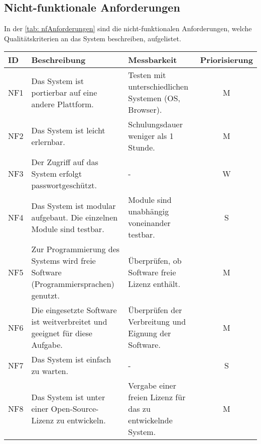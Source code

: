 \subsection{Nicht-funktionale Anforderungen}
In der \autoref{tab: nfAnforderungen} sind die nicht-funktionalen Anforderungen, welche Qualitätskriterien an das System
beschreiben, aufgelistet.
\begingroup
\setlength{\tabcolsep}{10pt} %
\renewcommand{\arraystretch}{1.25} 
\begin{table}[h]
    \centering
    \begin{adjustbox}{max width=\textwidth}
    \begin{tabular}{lp{7.5cm}p{7.5cm}c}
       \toprule
       \textbf{ID}          & \textbf{Beschreibung} & \textbf{Messbarkeit} & \textbf{Priorisierung}\\
       \midrule
        NF1                               &Das System ist portierbar auf eine andere Plattform. & Testen mit unterschiedlichen Systemen (OS, Browser). & M\\
        NF2                               &Das System ist leicht erlernbar.& Schulungsdauer weniger als 1 Stunde.  & M\\
        NF3                               &Der Zugriff auf das System erfolgt passwortgeschützt. & -  & W\\
        NF4                               &Das System ist modular aufgebaut. Die einzelnen Module sind testbar. & Module sind unabhängig voneinander testbar. & S\\
        NF5                               &Zur Programmierung des Systems wird freie Software (Programmiersprachen) genutzt. & Überprüfen, ob Software freie Lizenz enthält.  & M\\
        NF6                               &Die eingesetzte Software ist weitverbreitet und geeignet für diese Aufgabe. & Überprüfen der Verbreitung und Eignung der Software. & M\\
        NF7                               &Das System ist einfach zu warten. & - & S\\
        NF8                               &Das System ist unter einer Open-Source-Lizenz zu entwickeln. & Vergabe einer freien Lizenz für das zu entwickelnde System.  & M\\

\end{tabular}
\end{adjustbox}
\end{table}
